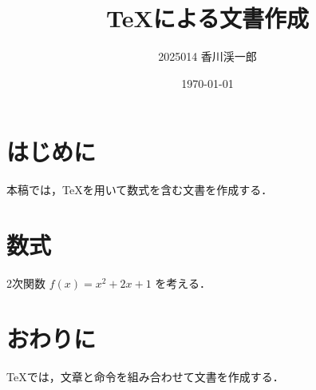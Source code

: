 \documentclass[uplatex,dvipdfmx,a4paper,12pt]{jsarticle}
\title{TeXによる文書作成}
\author{2025014 香川渓一郎}
\date{\today}
\begin{document}
\maketitle

\section{はじめに}

本稿では，TeXを用いて数式を含む文書を作成する．

\section{数式}

2次関数 $f(x)=x^2+2x+1$ を考える．

\section{おわりに}

TeXでは，文章と命令を組み合わせて文書を作成する．
\end{document}
